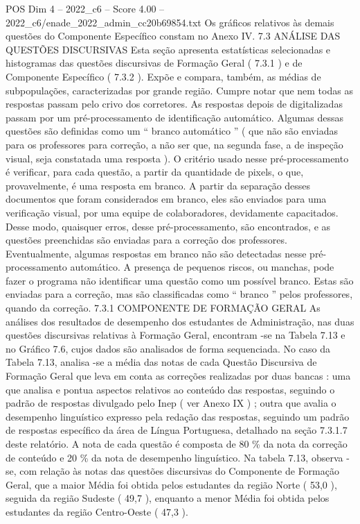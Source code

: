 \begin{textsample}{POS Dim 4 – 2022\_c6 – Score 4.00 – 2022\_c6/enade\_2022\_admin\_cc20b69854.txt}
Os gráficos relativos às demais questões do Componente Específico constam no Anexo IV. 7.3 ANÁLISE DAS QUESTÕES DISCURSIVAS Esta seção apresenta estatísticas selecionadas e histogramas das questões discursivas de Formação Geral ( 7.3.1 ) e de Componente Específico ( 7.3.2 ).
Expõe e compara, também, as médias de subpopulações, caracterizadas por grande região.
Cumpre notar que nem todas as respostas passam pelo crivo dos corretores.
As respostas depois de digitalizadas passam por um pré-processamento de identificação automático.
Algumas dessas questões são definidas como um “ branco automático ” ( que não são enviadas para os professores para correção, a não ser que, na segunda fase, a de inspeção visual, seja constatada uma resposta ).
O critério usado nesse pré-processamento é verificar, para cada questão, a partir da quantidade de pixels, o que, provavelmente, é uma resposta em branco.
A partir da separação desses documentos que foram considerados em branco, eles são enviados para uma verificação visual, por uma equipe de colaboradores, devidamente capacitados.
Desse modo, quaisquer erros, desse pré-processamento, são encontrados, e as questões preenchidas são enviadas para a correção dos professores.
Eventualmente, algumas respostas em branco não são detectadas nesse pré-processamento automático.
A presença de pequenos riscos, ou manchas, pode fazer o programa não identificar uma questão como um possível branco.
Estas são enviadas para a correção, mas são classificadas como “ branco ” pelos professores, quando da correção. 7.3.1 COMPONENTE DE FORMAÇÃO GERAL As análises dos resultados de desempenho dos estudantes de Administração, nas duas questões discursivas relativas à Formação Geral, encontram -se na Tabela 7.13 e no Gráfico 7.6, cujos dados são analisados de forma sequenciada.
No caso da Tabela 7.13, analisa -se a média das notas de cada Questão Discursiva de Formação Geral que leva em conta as correções realizadas por duas bancas : uma que analisa e pontua aspectos relativos ao conteúdo das respostas, seguindo o padrão de respostas divulgado pelo Inep ( ver Anexo IX ) ; outra que avalia o desempenho linguístico expresso pela redação das respostas, seguindo um padrão de respostas específico da área de Língua Portuguesa, detalhado na seção 7.3.1.7 deste relatório.
A nota de cada questão é composta de 80 \% da nota da correção de conteúdo e 20 \% da nota de desempenho linguístico.
Na tabela 7.13, observa -se, com relação às notas das questões discursivas do Componente de Formação Geral, que a maior Média foi obtida pelos estudantes da região Norte ( 53,0 ), seguida da região Sudeste ( 49,7 ), enquanto a menor Média foi obtida pelos estudantes da região Centro-Oeste ( 47,3 ).

\end{textsample}
